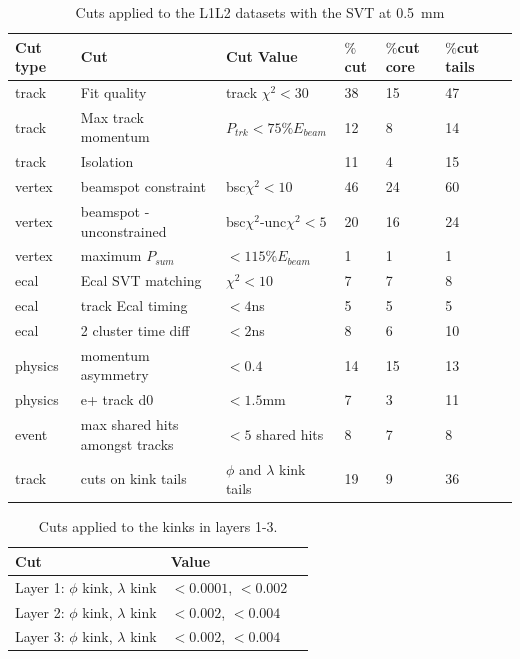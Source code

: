 \begin{table}[htb]
\caption{Cuts applied to the L1L2 datasets with the SVT at 0.5~mm}
\label{l1l2_cuts}
\centering
\begin{tabular}{lllllll}
\toprule
Cut type & Cut & Cut Value &  $\%$cut &  $\%$cut core & $\%$cut tails\\
\midrule
track & Fit quality & track $\chi^{2}<30$ & 38 & 15 & 47 \\
track & Max track momentum &  $P_{trk}<75\%E_{beam}$ & 12 & 8 & 14 \\
track & Isolation &   & 11 & 4 & 15 \\
vertex & beamspot constraint & bsc$\chi^{2}<10$  & 46 & 24 & 60 \\
vertex & beamspot - unconstrained & bsc$\chi^{2}$-unc$\chi^2<5$  & 20 & 16 & 24 \\
vertex & maximum $P_{sum}$ &  $<115\%E_{beam}$ & 1 & 1 & 1 \\
ecal & Ecal SVT matching & $\chi^2<10$  & 7 & 7 & 8 \\
ecal & track Ecal timing & $<4$ns  & 5 & 5 & 5 \\
ecal & 2 cluster time diff & $<2$ns  & 8 & 6 & 10 \\
physics & momentum asymmetry & $<0.4$  & 14 & 15 & 13 \\
physics & e+ track d0 & $<1.5$mm  & 7 & 3 & 11 \\
event & max shared hits amongst tracks & $<5$ shared hits  & 8 & 7 & 8 \\
track & cuts on kink tails & $\phi$ and $\lambda$ kink tails & 19 & 9 & 36 \\
\bottomrule
\end{tabular}
\end{table}
\begin{table}[htb]
\caption{Cuts applied to the kinks in layers 1-3.}
\label{kink_cuts}
\centering
\begin{tabular}{lll}
\toprule
Cut & Value \\
\midrule
Layer 1: $\phi$ kink, $\lambda$ kink & $<0.0001$, $<0.002$\\
Layer 2: $\phi$ kink, $\lambda$ kink & $<0.002$, $<0.004$\\
Layer 3: $\phi$ kink, $\lambda$ kink & $<0.002$, $<0.004$\\
\bottomrule
\end{tabular}
\end{table}
